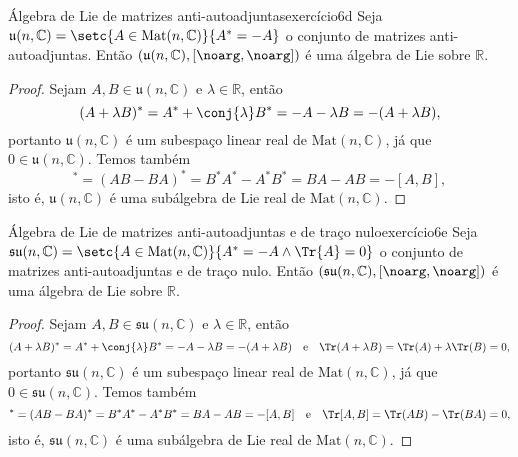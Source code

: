 \begin{proposition}{Álgebra de Lie de matrizes anti-autoadjuntas}{exercício6d}
    Seja \(\mathfrak{u}(n, \mathbb{C}) = \setc{A \in \mathrm{Mat}(n, \mathbb{C})}{A^* = -A}\) o conjunto de matrizes anti-autoadjuntas. Então \((\mathfrak{u}(n, \mathbb{C}), [\noarg, \noarg])\) é uma álgebra de Lie sobre \(\mathbb{R}\).
\end{proposition}
\begin{proof}
    Sejam \(A, B \in \mathfrak{u}(n, \mathbb{C})\) e \(\lambda \in \mathbb{R}\), então
    \begin{equation*}
        (A + \lambda B)^* = A^* + \conj{\lambda} B^* = - A - \lambda B = - (A + \lambda B),
    \end{equation*}
    portanto \(\mathfrak{u}(n, \mathbb{C})\) é um subespaço linear real de \(\mathrm{Mat}(n, \mathbb{C})\), já que \(0 \in \mathfrak{u}(n, \mathbb{C})\). Temos também
    \begin{equation*}
        [A,B]^* = (AB - BA)^* = B^* A^* - A^* B^* = BA - AB = -[A,B],
    \end{equation*}
    isto é, \(\mathfrak{u}(n, \mathbb{C})\) é uma subálgebra de Lie real de \(\mathrm{Mat}(n, \mathbb{C})\).
\end{proof}

\begin{proposition}{Álgebra de Lie de matrizes anti-autoadjuntas e de traço nulo}{exercício6e}
    Seja \(\mathfrak{su}(n, \mathbb{C}) = \setc{A \in \mathrm{Mat}(n, \mathbb{C})}{A^*= -A\land \Tr{A} = 0}\) o conjunto de matrizes anti-autoadjuntas e de traço nulo. Então \((\mathfrak{su}(n, \mathbb{C}), [\noarg, \noarg])\) é uma álgebra de Lie sobre \(\mathbb{R}\).
\end{proposition}
\begin{proof}
    Sejam \(A, B \in \mathfrak{su}(n, \mathbb{C})\) e \(\lambda \in \mathbb{R}\), então
    \begin{equation*}
        (A + \lambda B)^* = A^* + \conj{\lambda} B^* = - A - \lambda B = - (A + \lambda B)
        \quad\text{e}\quad
        \Tr(A + \lambda B) = \Tr(A) + \lambda \Tr(B) = 0,
    \end{equation*}
    portanto \(\mathfrak{su}(n, \mathbb{C})\) é um subespaço linear real de \(\mathrm{Mat}(n, \mathbb{C})\), já que \(0 \in \mathfrak{su}(n, \mathbb{C})\). Temos também
    \begin{equation*}
        [A,B]^* = (AB - BA)^* = B^* A^* - A^* B^* = BA - AB = -[A,B]
        \quad\text{e}\quad
        \Tr[A,B] = \Tr(AB) - \Tr(BA) = 0,
    \end{equation*}
    isto é, \(\mathfrak{su}(n, \mathbb{C})\) é uma subálgebra de Lie real de \(\mathrm{Mat}(n, \mathbb{C})\).
\end{proof}

